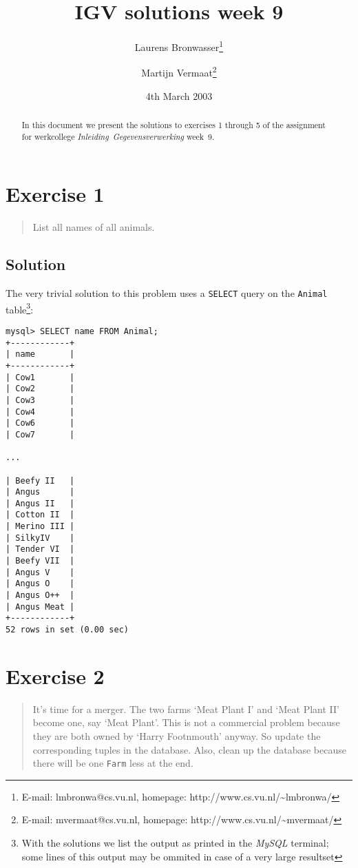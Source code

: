 \documentclass[11pt]{article}
\title{IGV solutions week 9}
\author{
	Laurens Bronwasser\footnote{E-mail: lmbronwa@cs.vu.nl, homepage: http://www.cs.vu.nl/\~{}lmbronwa/}
	\and
	Martijn Vermaat\footnote{E-mail: mvermaat@cs.vu.nl, homepage: http://www.cs.vu.nl/\~{}mvermaat/}
}
\date{4th March 2003}
\begin{document}
\maketitle

\begin{abstract}
In this document we present the solutions to exercises 1 through 5 of the assignment for werkcollege \emph{\mbox{Inleiding Gegevensverwerking}} \mbox{week 9}.
\end{abstract}

\tableofcontents


\newpage

\section{Exercise 1}

\begin{quote}
List all names of all animals.
\end{quote}

\subsection*{Solution}

The very trivial solution to this problem uses a \verb|SELECT| query on the \verb|Animal| table\footnote{With the solutions we list the output as printed in the \emph{MySQL} terminal; some lines of this output may be ommited in case of a very large resultset}:

\begin{verbatim}
mysql> SELECT name FROM Animal;
+------------+
| name       |
+------------+
| Cow1       |
| Cow2       |
| Cow3       |
| Cow4       |
| Cow6       |
| Cow7       |

...

| Beefy II   |
| Angus      |
| Angus II   |
| Cotton II  |
| Merino III |
| SilkyIV    |
| Tender VI  |
| Beefy VII  |
| Angus V    |
| Angus O    |
| Angus O++  |
| Angus Meat |
+------------+
52 rows in set (0.00 sec)
\end{verbatim}


\newpage

\section{Exercise 2}

\begin{quote}
It's time for a merger. The two farms `Meat Plant I' and `Meat Plant II' become one, say `Meat Plant'. This is not a commercial problem because they are both owned by `Harry Footnmouth' anyway. So update the corresponding tuples in the database. Also, clean up the database because there will be one \verb|Farm| less at the end.
\end{quote}
\end{document}
